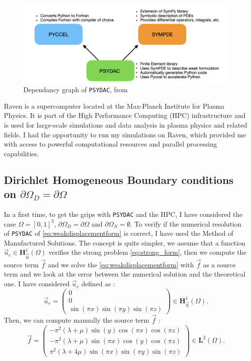 \documentclass[a4paper,12pt,twoside]{report}
\begin{document}
\begin{figure}[!h]
    \centering
    \includegraphics[width=0.75\linewidth]{psydac_fonc_1.png}
    \caption{Dependancy graph of \texttt{PSYDAC}, from \cite{guclu_psydac_2022}}
    \label{fig:Dependancy_Psydac}
\end{figure}

Raven is a supercomputer located at the Max-Planck Institute for Plasma Physics. It is part of the High Performance Computing (HPC) infrastructure and is used for large-scale simulations and data analysis in plasma physics and related fields. I had the opportunity to run my simulations on Raven, which provided me with access to powerful computational resources and parallel processing capabilities.

\subsection{Dirichlet Homogeneous Boundary conditions on $\partial\Omega_D = \partial\Omega$} \label{subsec:Dirichlet Homogeneous Boundary conditions on}

In a first time, to get the grips with \texttt{PSYDAC} and the HPC, I have considered the case $\Omega = [0,1]^3$, $\partial \Omega_D = \partial\Omega$ and $\partial \Omega_N = \emptyset$. To verify if the numerical resolution of \texttt{PSYDAC} of \eqref{eq:weakdisplacementform} is correct, I have used the Method of Manufactured Solutions. The concept is quite simpler, we assume that a function $\vec u_e \in \boldsymbol H^1_{\vec 0}(\Omega)$ verifies the strong problem \eqref{eq:strong_form}, then we compute the source term $\vec f$ and we solve the \eqref{eq:weakdisplacementform} with $\vec f$ as a source term and we look at the error between the numerical solution and the theoretical one.
I have considered $\vec u_e$ defined as : $$\vec u_e = \begin{pmatrix}
    0 \\
    0 \\
\sin{\left(\pi x \right)} \sin{\left(\pi y \right)} \sin{\left(\pi z \right)}
\end{pmatrix} \in \boldsymbol H^1_{\vec 0}(\Omega).$$ Then, we can compute manually the source term $\vec f$ : $$\vec f = \begin{pmatrix}
     - \pi^{2} \left(\lambda + \mu\right) \sin{\left( y \right)} \cos{\left(\pi x \right)} \cos{\left(\pi z \right)} \\
     - \pi^{2} \left(\lambda + \mu\right) \sin{\left(\pi x \right)} \cos{\left( y \right)} \cos{\left(\pi z \right)} \\  
      \pi^{2} \left(\lambda + 4 \mu\right) \sin{\left(\pi x \right)} \sin{\left(\pi y \right)} \sin{\left(\pi z \right)}
\end{pmatrix} \in \boldsymbol L^2(\Omega).$$
\end{document}
